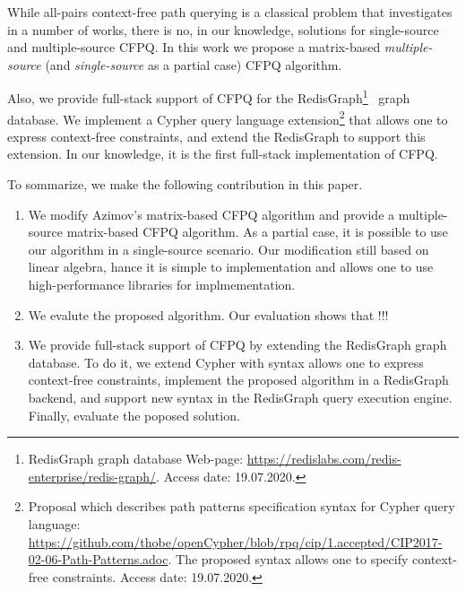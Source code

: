 While all-pairs context-free path querying is a classical problem that investigates in a number of works, there is no, in our knowledge, solutions for single-source and multiple-source CFPQ.
In this work we propose a matrix-based \textit{multiple-source} (and \textit{single-source} as a partial case) CFPQ algorithm.

Also, we provide full-stack support of CFPQ for the RedisGraph\footnote{RedisGraph graph database Web-page: \url{https://redislabs.com/redis-enterprise/redis-graph/}. Access date: 19.07.2020.}~\cite{8778293} graph database.
We implement a Cypher query language extension\footnote{Proposal which describes path patterns specification syntax for Cypher query language: \url{https://github.com/thobe/openCypher/blob/rpq/cip/1.accepted/CIP2017-02-06-Path-Patterns.adoc}. The proposed syntax allows one to specify context-free constraints. Access date: 19.07.2020.} that allows one to express context-free constraints, and extend the RedisGraph to support this extension.
In our knowledge, it is the first full-stack implementation of CFPQ.

To sommarize, we make the following contribution in this paper.
\begin{enumerate}
	\item We modify Azimov's matrix-based CFPQ algorithm and provide a multiple-source matrix-based CFPQ algorithm.
	As a partial case, it is possible to use our algorithm in a single-source scenario.
	Our modification still based on linear algebra, hance it is simple to implementation and allows one to use high-performance libraries for implmementation. 
	\item We evalute the proposed algorithm.
	Our evaluation shows that !!!
	\item We provide full-stack support of CFPQ by extending the RedisGraph graph database.
	To do it, we extend Cypher with syntax allows one to express context-free constraints, implement the proposed algorithm in a RedisGraph backend, and support new syntax in the RedisGraph query execution engine. Finally, evaluate the poposed solution.
\end{enumerate}